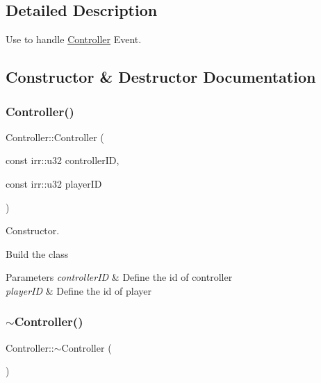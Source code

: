 \subsection{Detailed Description}
Use to handle \hyperlink{classController}{Controller} Event. 

\subsection{Constructor \& Destructor Documentation}
\mbox{\label{classController_ac4a14971762c0d091606211711762273}} 
\subsubsection{\texorpdfstring{Controller()}{Controller()}}
{\footnotesize\ttfamily Controller\+::\+Controller (\begin{DoxyParamCaption}\item[{const irr\+::u32}]{controller\+ID,  }\item[{const irr\+::u32}]{player\+ID }\end{DoxyParamCaption})}



Constructor. 

Build the class


\begin{DoxyParams}{Parameters}
{\em controller\+ID} & Define the id of controller\\
\hline
{\em player\+ID} & Define the id of player \\
\hline
\end{DoxyParams}
\mbox{\label{classController_a0ab87934c4f7a266cfdb86e0f36bc1b5}} 
\subsubsection{\texorpdfstring{$\sim$\+Controller()}{~Controller()}}
{\footnotesize\ttfamily Controller\+::$\sim$\+Controller (\begin{DoxyParamCaption}{ }\end{DoxyParamCaption})}



